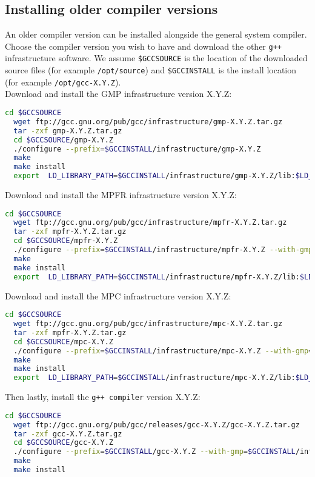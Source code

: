 \documentclass[12pt,a4paper]{report}
\begin{document}
\subsection{Installing older compiler versions}
An older compiler version can be installed alongside the general system compiler. Choose the compiler version you wish to have and download the other \texttt{g++} infrastructure software. We assume \texttt{\$GCCSOURCE} is the location of the downloaded source files (for example \texttt{/opt/source}) and \texttt{\$GCCINSTALL} is the install location (for example \texttt{/opt/gcc-X.Y.Z}).\\
Download and install the GMP infrastructure version X.Y.Z:
\begin{lstlisting}[language=bash]
  cd $GCCSOURCE
  wget ftp://gcc.gnu.org/pub/gcc/infrastructure/gmp-X.Y.Z.tar.gz
  tar -zxf gmp-X.Y.Z.tar.gz
  cd $GCCSOURCE/gmp-X.Y.Z
  ./configure --prefix=$GCCINSTALL/infrastructure/gmp-X.Y.Z
  make
  make install
  export  LD_LIBRARY_PATH=$GCCINSTALL/infrastructure/gmp-X.Y.Z/lib:$LD_LIBRARY_PATH
\end{lstlisting}
Download and install the MPFR infrastructure version X.Y.Z:
\begin{lstlisting}[language=bash]
  cd $GCCSOURCE
  wget ftp://gcc.gnu.org/pub/gcc/infrastructure/mpfr-X.Y.Z.tar.gz
  tar -zxf mpfr-X.Y.Z.tar.gz
  cd $GCCSOURCE/mpfr-X.Y.Z
  ./configure --prefix=$GCCINSTALL/infrastructure/mpfr-X.Y.Z --with-gmp=$GCCINSTALL/infrastructure/gmp-X.Y.Z
  make
  make install
  export  LD_LIBRARY_PATH=$GCCINSTALL/infrastructure/mpfr-X.Y.Z/lib:$LD_LIBRARY_PATH
\end{lstlisting}
Download and install the MPC infrastructure version X.Y.Z:
\begin{lstlisting}[language=bash]
  cd $GCCSOURCE
  wget ftp://gcc.gnu.org/pub/gcc/infrastructure/mpc-X.Y.Z.tar.gz
  tar -zxf mpfr-X.Y.Z.tar.gz
  cd $GCCSOURCE/mpc-X.Y.Z
  ./configure --prefix=$GCCINSTALL/infrastructure/mpc-X.Y.Z --with-gmp=$GCCINSTALL/infrastructure/gmp-X.Y.Z --with-mpfr=$GCCINSTALL/infrastructure/mpfr-X.Y.Z
  make
  make install
  export  LD_LIBRARY_PATH=$GCCINSTALL/infrastructure/mpc-X.Y.Z/lib:$LD_LIBRARY_PATH
\end{lstlisting}
Then lastly, install the \texttt{g++ compiler} version X.Y.Z:
\begin{lstlisting}[language=bash]
  cd $GCCSOURCE
  wget ftp://gcc.gnu.org/pub/gcc/releases/gcc-X.Y.Z/gcc-X.Y.Z.tar.gz
  tar -zxf gcc-X.Y.Z.tar.gz
  cd $GCCSOURCE/gcc-X.Y.Z
  ./configure --prefix=$GCCINSTALL/gcc-X.Y.Z --with-gmp=$GCCINSTALL/infrastructure/gmp-X.Y.Z --with-mpfr=$GCCINSTALL/infrastructure/mpfr-X.Y.Z --with-mpc=$GCCINSTALL/infrastructure/mpc-X.Y.Z
  make
  make install
\end{lstlisting}
\end{document}

